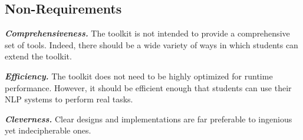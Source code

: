 \documentclass[11pt]{article}
\begin{document}
\subsection{Non-Requirements}

\noindent\textit{\textbf{Comprehensiveness.}} The toolkit is not intended to
provide a comprehensive set of tools.  Indeed, there should be a wide
variety of ways in which students can extend the toolkit.

\noindent\textit{\textbf{Efficiency.}} The toolkit does not need to be highly
optimized for runtime performance.  However, it should be efficient
enough that students can use their NLP systems to perform real tasks.

\noindent\textit{\textbf{Cleverness.}} Clear designs and implementations are
far preferable to ingenious yet indecipherable ones.
\end{document}
